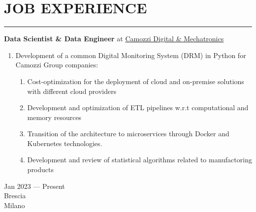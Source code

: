 \documentclass[10pt]{article}
\newcommand{\cvsection}[1]{\section*{\centering\normalsize\uppercase{#1}}\vspace{-16pt}\rule{\linewidth}{0.2pt}\vspace{6pt}}
\begin{document}
\cvsection{Job Experience}
\noindent
\begin{minipage}[t]{.80\textwidth}
	\raggedright
	\textbf{Data Scientist \& Data Engineer} at \href{https://en.digitalmechatronics.camozzi.com/}{Camozzi Digital \& Mechatronics}
	\begin{enumerate}
		\item Development of a common Digital Monitoring System (DRM) in Python for Camozzi Group companies:
		\begin{enumerate}
			\item Cost-optimization for the deployment of cloud and on-premise solutions with different cloud providers
			\item Development and optimization of ETL pipelines w.r.t computational and memory resources
			\item Transition of the architecture to microservices through Docker and Kubernetes technologies.
			\item Development and review of statistical algorithms related to manufactoring products
		\end{enumerate}
  \end{enumerate}
\end{minipage}%
\hspace{.02\textwidth}\vrule\hspace{.02\textwidth}
\begin{minipage}[t]{.16\textwidth}
	\raggedleft
	Jan 2023 --- Present\\
	\small Brescia\\
	\small Milano\\
\end{minipage}%
\noindent
\par\vspace{6pt}
\end{document}
